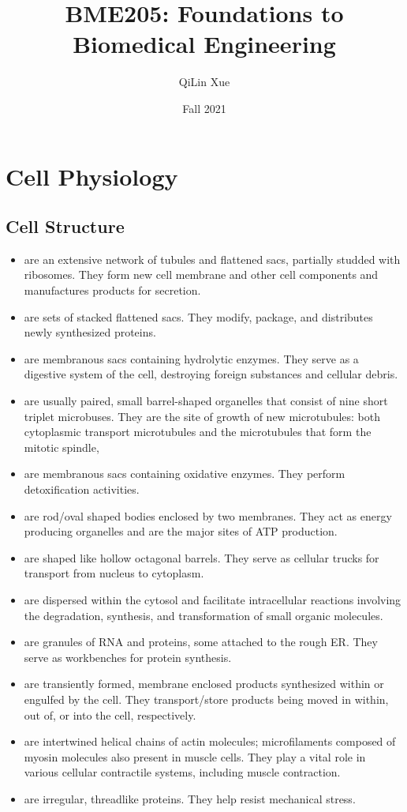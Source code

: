 \documentclass{article}
\title{BME205: Foundations to Biomedical Engineering}
\author{QiLin Xue}
\date{Fall 2021}
\numberwithin{equation}{section}
\begin{document}
\maketitle
\tableofcontents
\newpage
\section{Cell Physiology}
\subsection{Cell Structure}
\begin{itemize}
    \item {} are an extensive network of tubules and flattened sacs, partially studded with ribosomes.  They form new cell membrane and other cell components and manufactures products for secretion.
    \item {} are sets of stacked flattened sacs. They modify, package, and distributes newly synthesized proteins.
    \item {} are membranous sacs containing hydrolytic enzymes. They serve as a digestive system of the cell, destroying foreign substances and cellular debris.
    \item {} are usually paired, small barrel-shaped organelles that consist of nine short triplet microbuses. They are the site of growth of new microtubules: both cytoplasmic transport microtubules and the microtubules that form the mitotic spindle,
    \item {} are membranous sacs containing oxidative enzymes. They perform detoxification activities.
    \item {} are rod/oval shaped bodies enclosed by two membranes. They act as energy producing organelles and are the major sites of ATP production.
    \item {} are shaped like hollow octagonal barrels. They serve as cellular trucks for transport from nucleus to cytoplasm.
    \item {} are dispersed within the cytosol and facilitate intracellular reactions involving the degradation, synthesis, and transformation of small organic molecules.
    \item {} are granules of RNA and proteins, some attached to the rough ER. They serve as workbenches for protein synthesis.
    \item {} are transiently formed, membrane enclosed products synthesized within or engulfed by the cell. They transport/store products being moved in within, out of, or into the cell, respectively.
    \item {} are intertwined helical chains of actin molecules; microfilaments composed of myosin molecules also present in muscle cells. They play a vital role in various cellular contractile systems, including muscle contraction.
    \item {} are irregular, threadlike proteins. They help resist mechanical stress.
\end{itemize}
\end{document}
